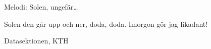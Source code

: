 \begin{song}

\begin{songmeta}
Melodi: Solen, ungefär\ldots
\end{songmeta}

\begin{songtext}
Solen den går upp och ner, doda, doda.
Imorgon gör jag likadant!
\end{songtext}

\begin{songnotes}
Datasektionen, KTH
\end{songnotes}

\end{song}

